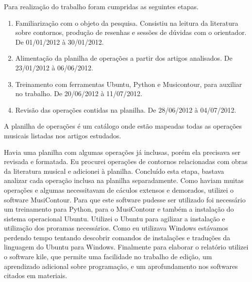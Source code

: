 \documentclass[11pt]{article}
\begin{document}
Para realização do trabalho foram cumpridas as seguintes etapas.

\begin{enumerate}
\item Familiarização com o objeto da pesquisa. Consistiu na leitura da
  literatura sobre contornos, produção de resenhas e sessões de dúvidas
  com o orientador. De 01/01/2012 à 30/01/2012.
\item Alimentação da planilha de operações a partir dos artigos
  analisados. De 23/01/2012 à 06/06/2012.
\item Treinamento com ferramentas Ubuntu, Python e Musicontour, para
  auxiliar no trabalho. De 20/06/2012 à 11/07/2012.
\item Revisão das operações contidas na planilha. De 28/06/2012 à 04/07/2012.
\end{enumerate}

A planilha de operações é um catálogo onde estão mapeadas todas as
operações musicais listadas nos artigos estudados.

Havia uma planilha com algumas operações já inclusas, porém ela
precisava ser revisada e formatada.
Eu procurei operações de contornos relacionadas com obras da literatura
musical e adicionei à planilha. Concluído esta etapa, bastava
analizar cada operação inclusa na planilha separadamente. Como haviam
muitas operações e algumas necessitavam de cáculos extensos e
demorados, utilizei o software MusiContour. Para que este
software pudesse ser utilizado foi necessário um treinamento para
Python, para o MusiContour e também a instalação do sistema
operacional Ubuntu. Utilizei o Ubuntu para agilizar a instalação
e utilização dos proramas necessários. Como eu utilizava Windows
estávamos perdendo tempo tentando descobrir comandos de instalações e
traduções da linguagem do Ubuntu para Windows. Finalmente para
elaborar o relatório utilizei o software kile, que permite uma
facilidade no trabalho de edição, um aprendizado adicional sobre
programação, e um aprofundamento nos softwares citados em materiais.
\end{document}
